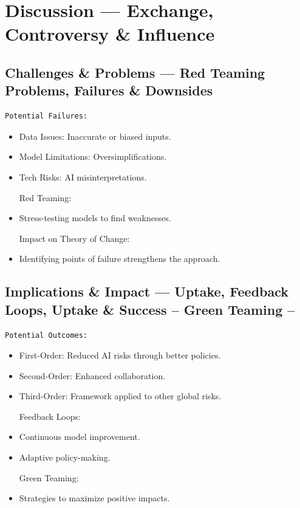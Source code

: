 \documentclass[
  letterpaper,
]{book}
\begin{document}

\chapter{Discussion --- Exchange, Controversy \&
Influence}\label{discussion-exchange-controversy-influence}

\section{Challenges \& Problems --- Red Teaming Problems, Failures \&
Downsides}\label{challenges-problems-red-teaming-problems-failures-downsides}

\begin{verbatim}
Potential Failures:
\end{verbatim}

\begin{itemize}
\item
  Data Issues: Inaccurate or biased inputs.\\
\item
  Model Limitations: Oversimplifications.\\
\item
  Tech Risks: AI misinterpretations.

  Red Teaming:
\item
  Stress-testing models to find weaknesses.

  Impact on Theory of Change:
\item
  Identifying points of failure strengthens the approach.
\end{itemize}

\section{Implications \& Impact --- Uptake, Feedback Loops, Uptake \&
Success -- Green Teaming
--}\label{implications-impact-uptake-feedback-loops-uptake-success-green-teaming}

\begin{verbatim}
Potential Outcomes:
\end{verbatim}

\begin{itemize}
\item
  First-Order: Reduced AI risks through better policies.\\
\item
  Second-Order: Enhanced collaboration.\\
\item
  Third-Order: Framework applied to other global risks.

  Feedback Loops:
\item
  Continuous model improvement.\\
\item
  Adaptive policy-making.

  Green Teaming:
\item
  Strategies to maximize positive impacts.
\end{itemize}
\end{document}
